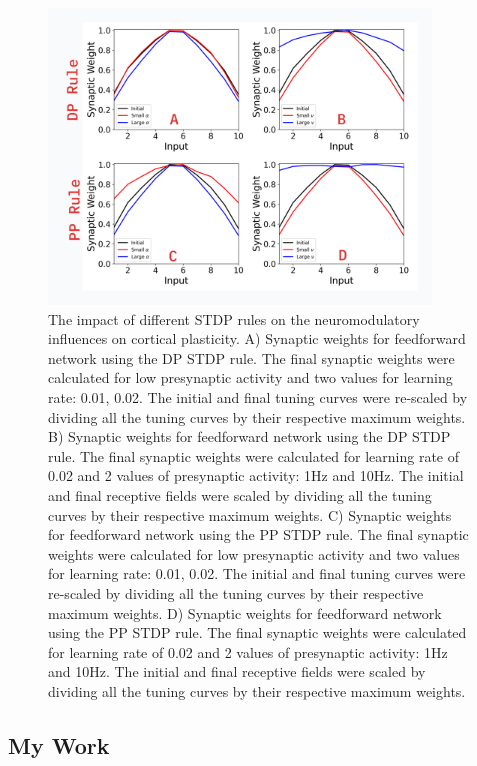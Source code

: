 \begin{figure}[ht]
    \vskip 0.2in
    \begin{center}
    \centerline{\includegraphics[width=4in]{figures/figure-1.png}}
    \caption{The impact of different STDP rules on the neuromodulatory influences on cortical plasticity. A) Synaptic weights for feedforward network using the DP STDP rule. The final synaptic weights were calculated for low presynaptic activity and two values for learning rate: 0.01, 0.02. The initial and final tuning curves were re-scaled by dividing all the tuning curves by their respective maximum weights. B) Synaptic weights for feedforward network using the DP STDP rule. The final synaptic weights were calculated for learning rate of 0.02 and 2 values of presynaptic activity: 1Hz and 10Hz. The initial and final receptive fields were scaled by dividing all the tuning curves by their respective maximum weights. C) Synaptic weights for feedforward network using the PP STDP rule. The final synaptic weights were calculated for low presynaptic activity and two values for learning rate: 0.01, 0.02. The initial and final tuning curves were re-scaled by dividing all the tuning curves by their respective maximum weights. D) Synaptic weights for feedforward network using the PP STDP rule. The final synaptic weights were calculated for learning rate of 0.02 and 2 values of presynaptic activity: 1Hz and 10Hz. The initial and final receptive fields were scaled by dividing all the tuning curves by their respective maximum weights.} 
    \label{figure-1}
    \end{center}
    \vskip -0.1in
    \end{figure}

\subsection{My Work}

